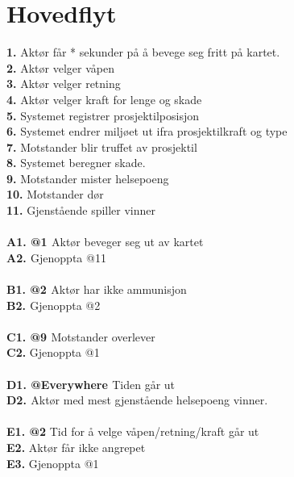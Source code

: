 \documentclass[norsk,a4paper]{article}
\begin{document}
\section{Hovedflyt}
\label{tips_tekst} %

\textbf{\large{1.}}	Aktør får * sekunder på å bevege seg fritt på kartet. \\
\textbf{\large{2.}}	Aktør velger våpen \\
\textbf{\large{3.}}	Aktør velger retning \\
\textbf{\large{4.}}	Aktør velger kraft for lenge og skade \\
\textbf{\large{5.}}	Systemet registrer prosjektilposisjon \\
\textbf{\large{6.}}	Systemet endrer miljøet ut ifra prosjektilkraft og type \\
\textbf{\large{7.}}   Motstander blir truffet av prosjektil \\
\textbf{\large{8.}}  Systemet beregner skade. \\
\textbf{\large{9.}}  Motstander mister helsepoeng \\
\textbf{\large{10.}} Motstander dør \\
\textbf{\large{11.}} Gjenstående spiller vinner \\	

\textbf{\large{}}\\
\textbf{\large{A1. @1 	}}Aktør beveger seg ut av kartet \\
\textbf{\large{A2. 		}} Gjenoppta @11\\
\\
\textbf{\large{B1. @2 }} Aktør har ikke ammunisjon\\
\textbf{\large{B2. }} Gjenoppta @2\\
\\
\textbf{\large{C1. @9 }} Motstander overlever\\
\textbf{\large{C2.}} Gjenoppta @1\\
\\
\textbf{\large{D1. @Everywhere	}}  Tiden går ut \\
\textbf{\large{D2. }}Aktør med mest gjenstående helsepoeng vinner.\\
\\
\textbf{\large{E1. @2}} Tid for å velge våpen/retning/kraft går ut \\
\textbf{\large{E2.}} Aktør får ikke angrepet \\
\textbf{\large{E3.}} Gjenoppta @1 \\
\end{document}
